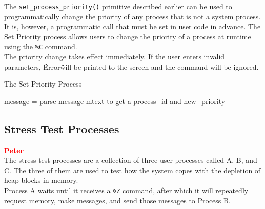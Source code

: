 \documentclass[12pt]{report}
\begin{document}
\begin{minipage}{\textwidth}
\begin{lstlisting}[language=C, frame=single]
%C process_id new_priority
\end{lstlisting}
\end{minipage}

The {\tt set\_process\_priority()} primitive described earlier can be used to programmatically change the priority of any process that is not a system process. It is, however, a programmatic call that must be set in user code in advance. The Set Priority process allows users to change the priority of a process at runtime using the {\tt \%C} command.\\

The priority change takes effect immediately. If the user enters invalid parameters, \"Error\" will be printed to the screen and the command will be ignored.\\

\begin{algorithm}
  \caption{The Set Priority Process}
  \begin{algorithmic}[1]
			\State message = 
			\State parse message mtext to get a process_id and new_priority
				\State {}
			\Else
			\EndIf
			\State {}
		\EndWhile
    \EndProcedure
  \end{algorithmic}
\end{algorithm}

\subsection{Stress Test Processes}

\textcolor{red}{\textbf{Peter}} \\

The stress test processes are a collection of three user processes called A, B, and C. The three of them are used to test how the system copes with the depletion of heap blocks in memory.\\

Process A waits until it receives a {\tt \%Z} command, after which it will repeatedly request memory, make messages, and send those messages to Process B.\\
\end{document}
